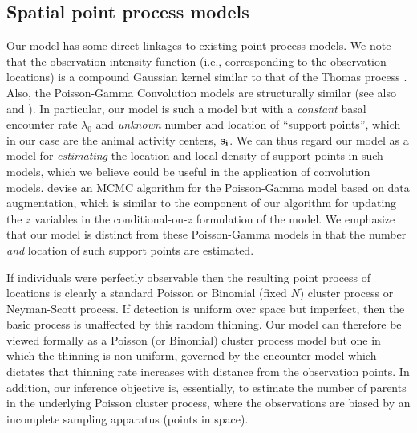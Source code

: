 \subsection{Spatial point process models}
\label{ss:similar}

Our model has some direct linkages to existing point process
models. We note that the observation intensity function (i.e.,
corresponding to the observation
locations) is a compound Gaussian kernel similar to
that of the Thomas process
\citep[pp. 61-62]{thomas:1949, moller_waagepetersen:2003}.
Also, the Poisson-Gamma Convolution models
\citep{wolpert_ickstadt:1998} are structurally similar (see also \cite{higdon:1998}
and \cite{best_etal:2000}).
 In particular, our model is such a model but
with a {\it constant} basal encounter rate $\lambda_{0}$
and {\it unknown} number and location of ``support points'', which in
our case are the animal activity centers, $\bf{s_i}$.
We can thus regard our model as a model for
{\it estimating} the location and local density of support points in
such models, which we believe could be useful in the application of
convolution models.  \citet{best_etal:2000} devise an MCMC algorithm for the
Poisson-Gamma model based on data augmentation, which is
similar to the component of our algorithm for
updating the $z$ variables in
the conditional-on-$z$ formulation of the model.  We emphasize that
our model is distinct from these Poisson-Gamma models
in that the number {\it and} location of such
support points are estimated.


If individuals were perfectly observable then the resulting point
process of locations is clearly a standard Poisson or Binomial (fixed
$N$) cluster process or Neyman-Scott process.
If detection is uniform over space but
imperfect, then the basic process is unaffected by this random thinning.
Our model can therefore be viewed formally as a Poisson (or Binomial)
cluster process model but one in which the thinning is
non-uniform, governed by the encounter model which dictates that
thinning rate increases with distance from the observation points. In
addition, our inference objective is, essentially, to estimate the
number of parents in the underlying Poisson cluster
process,
where the observations are biased by an incomplete sampling apparatus
(points in space).


